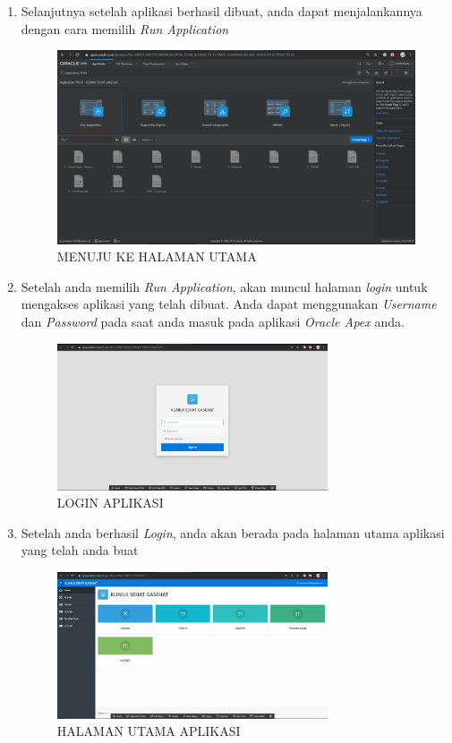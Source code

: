 \documentclass[a4paper, 12pt]{article}
\begin{document}
\begin{enumerate}
\item Selanjutnya setelah aplikasi berhasil dibuat, anda dapat menjalankannya dengan cara memilih \textit{Run Application}
\begin{figure}[h]
\begin{center}
\includegraphics[width=11cm]{figure/RA.png}
\caption{MENUJU KE HALAMAN UTAMA}
\end{center}
\end{figure}

\item Setelah anda memilih \textit{Run Application}, akan muncul halaman \textit{login} untuk mengakses aplikasi yang telah dibuat. Anda dapat menggunakan \textit{Username} dan \textit{Password} pada saat anda masuk pada aplikasi \textit{Oracle Apex} anda.
\begin{figure}[h]
\begin{center}
\includegraphics[width=8cm]{figure/L.png}
\caption{LOGIN APLIKASI}
\end{center}
\end{figure}

\item Setelah anda berhasil \textit{Login}, anda akan berada pada halaman utama aplikasi yang telah anda buat
\begin{figure}[h]
\begin{center}
\includegraphics[width=8cm]{figure/H.png}
\caption{HALAMAN UTAMA APLIKASI}
\end{center}
\end{figure}
\end{enumerate}
\end{document}
